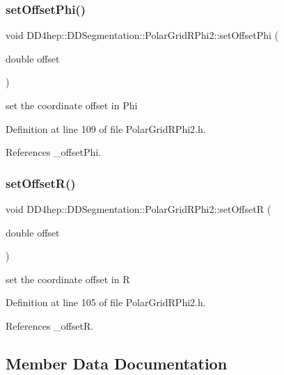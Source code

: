 \subsubsection{\texorpdfstring{set\+Offset\+Phi()}{setOffsetPhi()}}
{\footnotesize\ttfamily void D\+D4hep\+::\+D\+D\+Segmentation\+::\+Polar\+Grid\+R\+Phi2\+::set\+Offset\+Phi (\begin{DoxyParamCaption}\item[{double}]{offset }\end{DoxyParamCaption})\hspace{0.3cm}{\ttfamily [inline]}}



set the coordinate offset in Phi 



Definition at line 109 of file Polar\+Grid\+R\+Phi2.\+h.



References \+\_\+offset\+Phi.

\hypertarget{class_d_d4hep_1_1_d_d_segmentation_1_1_polar_grid_r_phi2_afe071e7c5168bda97cac7c4a64c9265e}{}\label{class_d_d4hep_1_1_d_d_segmentation_1_1_polar_grid_r_phi2_afe071e7c5168bda97cac7c4a64c9265e} 
\subsubsection{\texorpdfstring{set\+Offset\+R()}{setOffsetR()}}
{\footnotesize\ttfamily void D\+D4hep\+::\+D\+D\+Segmentation\+::\+Polar\+Grid\+R\+Phi2\+::set\+OffsetR (\begin{DoxyParamCaption}\item[{double}]{offset }\end{DoxyParamCaption})\hspace{0.3cm}{\ttfamily [inline]}}



set the coordinate offset in R 



Definition at line 105 of file Polar\+Grid\+R\+Phi2.\+h.



References \+\_\+offsetR.



\subsection{Member Data Documentation}
\hypertarget{class_d_d4hep_1_1_d_d_segmentation_1_1_polar_grid_r_phi2_a078188d23dac5d6ed26c85dddf0f9e74}{}\label{class_d_d4hep_1_1_d_d_segmentation_1_1_polar_grid_r_phi2_a078188d23dac5d6ed26c85dddf0f9e74} 

